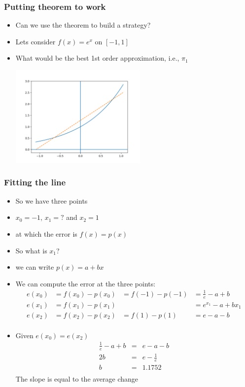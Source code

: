 \documentclass[10pt]{beamer}
\begin{document}
\begin{frame}
  \frametitle{Putting theorem to work}
  \begin{itemize}
  \item Can we use the theorem to build a strategy?
  \item Lets consider $f(x) = e^x \mbox{ on } [-1, 1]$
  \item What would be the best 1st order approximation, i.e., $\pi_1$
    \centerline{\includegraphics[height=5cm]{figure_1}}
  \end{itemize}
\end{frame}

\begin{frame}
  \frametitle{Fitting the line}
  \begin{itemize}
  \item So we have three points
  \item $x_0 = -1$, $x_1 = ? $ and $x_2 = 1$
  \item at which the error is $f(x) = p(x)$
  \item So what  is $x_1$?
    \pause
  \item we can write $p(x) = a + b x$
  \item We can compute the error at the three points:
    \[
      \begin{array}{llll}
        e(x_0) & = f(x_0) - p(x_0) & = f(-1) - p(-1) & = \frac{1}{e} - a + b\\
        e(x_1) & = f(x_1) - p(x_1) &                 & = e^{x_1} - a + b x_1\\
        e(x_2) & = f(x_2) - p(x_2) & = f(1) - p(1)   & = e - a - b\\
      \end{array}
    \]
  \item Given $e(x_0) = e(x_2)$
    \[
      \begin{array}{ccc}
        \frac{1}{e} - a + b & = & e - a - b\\
        2 b & = & e - \frac{1}{e} \\
        b   & = & 1.1752\\
      \end{array}
    \] The slope is equal to the average change
  \end{itemize}
\end{frame}
\end{document}

